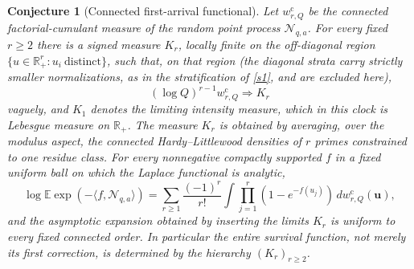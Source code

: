 \documentclass[11pt]{article}
\newtheorem{conjecture}{Conjecture}
\theoremstyle{definition}
\newcommand{\E}{\mathbb E}
\newcommand{\R}{\mathbb R}
\providecommand{\R}{\mathbb R}
\providecommand{\E}{\mathbb E}
\begin{document}
\begin{conjecture}[Connected first-arrival functional]\label{s6}
Let $w^{\mathrm c}_{r,Q}$ be the connected factorial-cumulant measure of the random point
process $\mathcal N_{q,a}$.  For every fixed $r\ge2$ there is a signed measure $K_r$, locally finite on the off-diagonal region $\{u\in\R_+^r:u_i\ \text{distinct}\}$, such that, on that region (the diagonal strata carry strictly smaller normalizations, as in the stratification of \cref{s1}, and are excluded here),
\[
 (\log Q)^{r-1}w^{\mathrm c}_{r,Q}\Longrightarrow K_r
\]
vaguely, and $K_1$ denotes the limiting intensity measure, which in this clock is
Lebesgue measure on $\R_+$.  The measure $K_r$ is obtained by averaging, over the
modulus aspect, the connected Hardy--Littlewood densities of $r$ primes constrained to
one residue class.  For every nonnegative compactly supported $f$ in a fixed uniform ball on which the
Laplace functional is analytic,
\[
 \log\E\exp(-\langle f,\mathcal N_{q,a}\rangle)
 =\sum_{r\ge1}\frac{(-1)^r}{r!}
 \int\prod_{j=1}^r(1-e^{-f(u_j)})\,dw^{\mathrm c}_{r,Q}(\mathbf u),
\]
and the asymptotic expansion obtained by inserting the limits $K_r$ is uniform to every
fixed connected order.  In particular the entire survival function, not merely its
first correction, is determined by the hierarchy $(K_r)_{r\ge2}$.
\end{conjecture}
\end{document}
